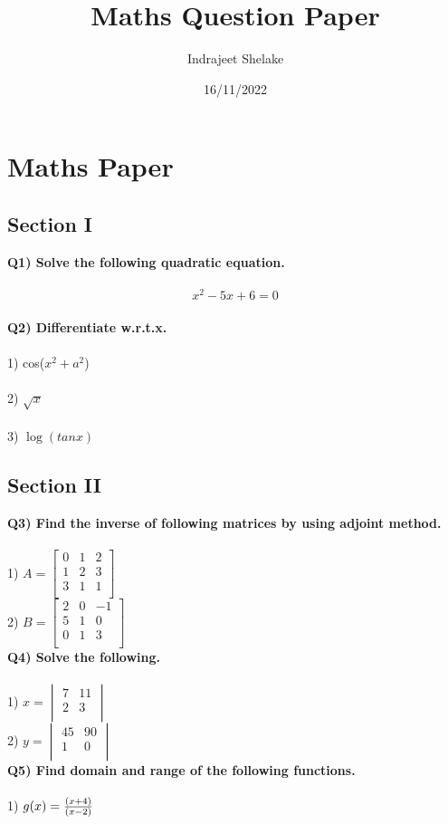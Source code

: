 \documentclass[12pt]{article}
\title{Maths Question Paper}
\author{Indrajeet Shelake}
\date{16/11/2022}
\begin{document}
\maketitle
\newpage
\tableofcontents

\newpage
\section{Maths Paper}
\subsection*{Section I}
\textbf{Q1) Solve the following quadratic equation.\\\\}
\begin{equation*}
x^2-5x+6 = 0 
\end{equation*}
\\
\textbf{Q2) Differentiate w.r.t.x.\\\\} 
1) cos($x^2+a^2$) \\\\
2) $\sqrt{x}$ \\\\
3) $\log{(tanx)}$ \\




\subsection*{Section II}
\textbf{Q3) Find the inverse of following matrices by using adjoint method.\\\\}
1) $ A = 
\begin{bmatrix}
0 & 1 & 2 \\
1 & 2 & 3 \\
3 & 1 & 1 \\
\end{bmatrix}
$ 
\\
2) $ B = 
\begin{bmatrix}
2 & 0 & -1 \\
5 & 1 & 0 \\
0 & 1 & 3 \\
\end{bmatrix}
$
\\
\textbf{Q4) Solve the following.\\\\}
1) $ x =  
\begin{vmatrix}
7 & 11 \\
2 & 3 \\
\end{vmatrix}
$
\\
2) $ y =  
\begin{vmatrix}
45 & 90 \\
1 & 0 \\
\end{vmatrix}
$
\\
\textbf{Q5) Find domain and range of the following functions.\\\\}
1) $ g(x) = 
\frac{(x+4)}{(x-2)} \\\\
$ %
\end{document}
